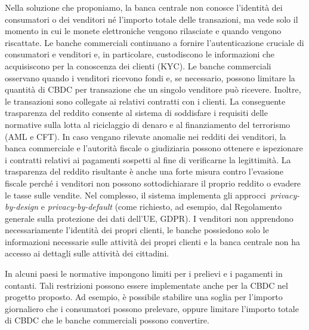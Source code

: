 \documentclass[a4paper]{article}
\begin{document}
Nella soluzione che proponiamo, la banca centrale non conosce
l'identità dei consumatori o dei venditori né l'importo totale delle
transazioni, ma vede solo il momento in cui le monete elettroniche vengono
rilasciate e quando vengono riscattate. Le banche commerciali continuano a
fornire l'autenticazione cruciale di consumatori e venditori e, in particolare,
custodiscono le informazioni che acquisiscono per la conoscenza dei clienti
(KYC). Le banche commerciali osservano quando i venditori ricevono fondi e, se
necessario, possono limitare la quantità di CBDC per transazione che
un singolo venditore può ricevere. Inoltre, le transazioni sono
collegate ai relativi contratti con i clienti. La conseguente
trasparenza del reddito  consente al sistema di soddisfare i requisiti
delle normative sulla lotta al riciclaggio di denaro e al
finanziamento del terrorismo (AML e CFT). In caso vengano rilevate
anomalie nei redditi dei venditori, la banca commerciale e
l'autorità fiscale o giudiziaria possono ottenere e ispezionare i
contratti relativi ai pagamenti sospetti al fine di verificarne la
legittimità. La trasparenza del reddito risultante è anche una forte
misura contro l'evasione fiscale perché i venditori non possono
sottodichiarare il proprio reddito o evadere le tasse sulle vendite.
Nel complesso, il sistema implementa gli approcci~\textit{privacy-by-design} 
e \textit{privacy-by-default} (come richiesto, ad esempio,
dal Regolamento generale sulla protezione dei dati dell'UE, GDPR). I
venditori non apprendono necessariamente l'identità dei propri clienti,
le banche possiedono solo le informazioni necessarie sulle attività dei
propri clienti e la banca centrale non ha accesso ai dettagli sulle
attività dei cittadini.

In alcuni paesi le normative impongono limiti per i prelievi e i
pagamenti in contanti. Tali restrizioni possono essere implementate
anche per la CBDC nel progetto proposto. Ad esempio, è possibile
stabilire una soglia per l'importo giornaliero che i consumatori possono
prelevare, oppure limitare l'importo totale di CBDC che le banche
commerciali possono convertire.
\end{document}
